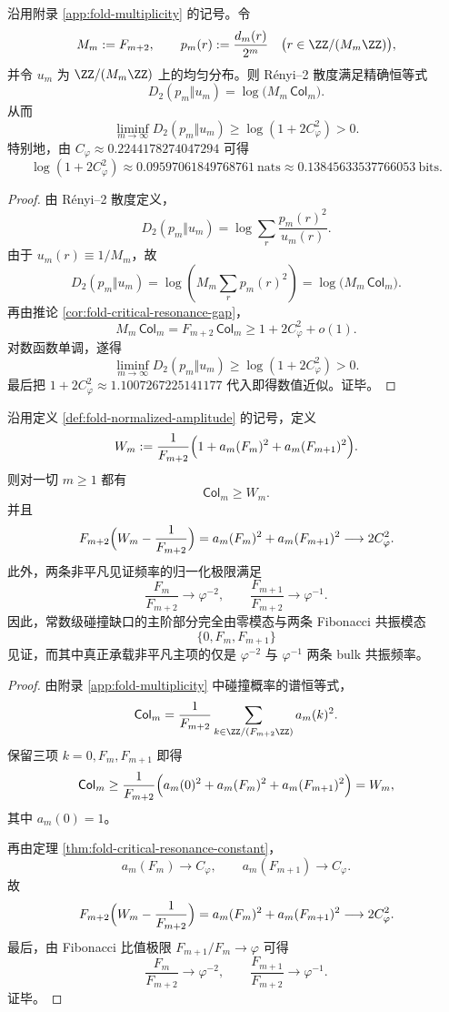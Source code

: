\begin{theorem}\label{thm:killo-fold-renyi2-uniformity-gap}
沿用附录 \ref{app:fold-multiplicity} 的记号。令
\[
M_m:=F_{m+2},
\qquad
p_m(r):=\frac{d_m(r)}{2^m}\quad \bigl(r\in \ZZ/(M_m\ZZ)\bigr),
\]
并令 \(u_m\) 为 \(\ZZ/(M_m\ZZ)\) 上的均匀分布。则 Rényi--2 散度满足精确恒等式
\[
D_2(p_m\Vert u_m)=\log\!\bigl(M_m\,\mathsf{Col}_m\bigr).
\]
从而
\[
\liminf_{m\to\infty}D_2(p_m\Vert u_m)\ge \log(1+2C_\varphi^2)>0.
\]
特别地，由
\(
C_\varphi\approx 0.2244178274047294
\)
可得
\[
\log(1+2C_\varphi^2)\approx 0.09597061849768761\ \text{nats}
\approx 0.13845633537766053\ \text{bits}.
\]
\end{theorem}
\begin{proof}
由 Rényi--2 散度定义，
\[
D_2(p_m\Vert u_m)
=
\log\sum_{r}\frac{p_m(r)^2}{u_m(r)}.
\]
由于 \(u_m(r)\equiv 1/M_m\)，故
\[
D_2(p_m\Vert u_m)
=
\log\!\left(M_m\sum_r p_m(r)^2\right)
=
\log\!\bigl(M_m\,\mathsf{Col}_m\bigr).
\]
再由推论 \ref{cor:fold-critical-resonance-gap}，
\[
M_m\,\mathsf{Col}_m
=
F_{m+2}\,\mathsf{Col}_m
\ge
1+2C_\varphi^2+o(1).
\]
对数函数单调，遂得
\[
\liminf_{m\to\infty}D_2(p_m\Vert u_m)\ge \log(1+2C_\varphi^2)>0.
\]
最后把
\(
1+2C_\varphi^2\approx 1.1007267225141177
\)
代入即得数值近似。证毕。
\end{proof}

\begin{theorem}[常数级碰撞缺口的三模见证与双共振承载]\label{thm:killo-fold-three-mode-witness-critical-gap}
沿用定义 \ref{def:fold-normalized-amplitude} 的记号，定义
\[
W_m:=
\frac{1}{F_{m+2}}
\Bigl(1+a_m(F_m)^2+a_m(F_{m+1})^2\Bigr).
\]
则对一切 \(m\ge 1\) 都有
\[
\mathsf{Col}_m\ge W_m.
\]
并且
\[
F_{m+2}\Bigl(W_m-\frac{1}{F_{m+2}}\Bigr)
=
a_m(F_m)^2+a_m(F_{m+1})^2
\longrightarrow 2C_\varphi^2.
\]
此外，两条非平凡见证频率的归一化极限满足
\[
\frac{F_m}{F_{m+2}}\to \varphi^{-2},
\qquad
\frac{F_{m+1}}{F_{m+2}}\to \varphi^{-1}.
\]
因此，常数级碰撞缺口的主阶部分完全由零模态与两条 Fibonacci 共振模态
\[
\{0,F_m,F_{m+1}\}
\]
见证，而其中真正承载非平凡主项的仅是 \(\varphi^{-2}\) 与 \(\varphi^{-1}\) 两条 bulk 共振频率。
\end{theorem}
\begin{proof}
由附录 \ref{app:fold-multiplicity} 中碰撞概率的谱恒等式，
\[
\mathsf{Col}_m
=
\frac{1}{F_{m+2}}\sum_{k\in \ZZ/(F_{m+2}\ZZ)}a_m(k)^2.
\]
保留三项 \(k=0,F_m,F_{m+1}\) 即得
\[
\mathsf{Col}_m
\ge
\frac{1}{F_{m+2}}
\Bigl(a_m(0)^2+a_m(F_m)^2+a_m(F_{m+1})^2\Bigr)
=
W_m,
\]
其中 \(a_m(0)=1\)。

再由定理 \ref{thm:fold-critical-resonance-constant}，
\[
a_m(F_m)\to C_\varphi,
\qquad
a_m(F_{m+1})\to C_\varphi.
\]
故
\[
F_{m+2}\Bigl(W_m-\frac{1}{F_{m+2}}\Bigr)
=
a_m(F_m)^2+a_m(F_{m+1})^2
\longrightarrow 2C_\varphi^2.
\]
最后，由 Fibonacci 比值极限
\(
F_{m+1}/F_m\to \varphi
\)
可得
\[
\frac{F_m}{F_{m+2}}\to \varphi^{-2},
\qquad
\frac{F_{m+1}}{F_{m+2}}\to \varphi^{-1}.
\]
证毕。
\end{proof}

\endinput
